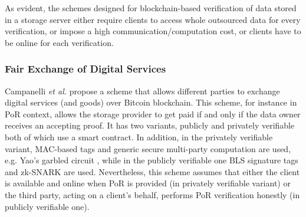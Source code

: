As evident,  the schemes designed for  blockchain-based verification of data stored in a storage server either require clients to access  whole outsourced data for  every verification, or impose a high communication/computation cost, or  clients have to be online for each verification. 

 \subsubsection{Fair Exchange of Digital Services}
 
 Campanelli \textit{et al.}  \cite{CampanelliGGN17} propose a scheme that allows different parties to exchange digital services (and goods) over Bitcoin blockchain. This scheme, for instance in PoR context, allows the storage provider to get paid  if and only if the data owner receives an accepting proof. It has two variants, publicly and  privately verifiable both of which use a smart contract.   In addition, in the privately verifiable variant,  MAC-based tags and generic secure multi-party computation are used, e.g. Yao's garbled circuit \cite{Yao82b}, while in the publicly verifiable one  BLS signature tags and zk-SNARK are used.  Nevertheless, this scheme assumes that either the client is  available and online when PoR is provided (in privately verifiable variant) or the third party, acting on a client's behalf, performs PoR verification honestly (in publicly verifiable one). 












